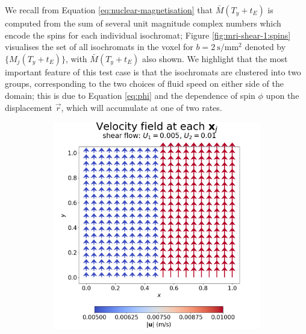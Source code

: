                 We recall from Equation \eqref{eq:nuclear-magnetisation} that $\bar{M}(T_y + t_E)$ is computed from the sum of several unit magnitude complex numbers which encode the spins for each individual isochromat; Figure \ref{fig:mri-shear-1:spins} visualises the set of all isochromats in the voxel for $b=\qty{2}{\second\per\milli\metre^2}$ denoted by $\{ M_j(T_y + t_E) \}$, with $\bar{M}(T_y + t_E)$ also shown. We highlight that the most important feature of this test case is that the isochromats are clustered into two groups, corresponding to the two choices of fluid speed on either side of the domain; this is due to Equation \eqref{eq:phi} and the dependence of spin $\phi$ upon the displacement $\vec{r}$, which will accumulate at one of two rates.

                \begin{figure}
                    \begin{subfigure}{0.5\textwidth}
                        \centering
                        \includegraphics[width=\textwidth]{diagrams/results-mri/simple-tests/mri-spins_quiver_2D_shear_test_1.png}

\end{subfigure}
\end{figure}
